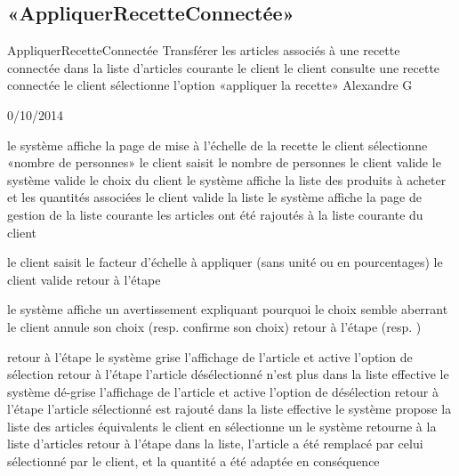 \subsection{«AppliquerRecetteConnectée»}

\startCU
\nom AppliquerRecetteConnectée
\but Transférer les articles associés à une recette connectée dans la liste d'articles courante
\acteur le client
\precondition le client consulte une recette connectée 
\declenchement le client sélectionne l'option «appliquer la recette»
\auteur Alexandre G
\date 30/10/2014

\nominal %
\startnominal
{} le système affiche la page de mise à l'échelle de la recette
 le client sélectionne «nombre de personnes» 
\etape le client saisit le nombre de personnes
\etape le client valide
 le système valide le choix du client
 le système affiche la liste des produits à acheter et les quantités associées
 le client valide la liste
\etape le système affiche la page de gestion de la liste courante
\stopnominal
\postcondition les articles ont été rajoutés à la liste courante du client

\alternatifs 
{} 
  \etape le client saisit le facteur d'échelle à appliquer (sans unité ou en pourcentages)
  \etape le client valide
  \etape retour à l'étape 
\stopcondition
\stopalternatif

  \etape le système affiche un avertissement expliquant pourquoi le choix semble aberrant
  \etape le client annule son choix (resp. confirme son choix)
  \etape retour à l'étape  (resp. )
\stopcondition
\stopalternatif

  \etape retour à l'étape 
\stopcondition
{} 
  \etape le système grise l'affichage de l'article et active l'option de sélection
  \etape retour à l'étape 
\stopcondition
\postcondition l'article désélectionné n'est plus dans la liste effective
  \etape le système dé-grise l'affichage de l'article et active l'option de désélection
  \etape retour à l'étape 
\stopcondition
\postcondition l'article sélectionné est rajouté dans la liste effective
  \etape le système propose la liste des articles équivalents
  \etape le client en sélectionne un
  \etape le système retourne à la liste d'articles
  \etape retour à l'étape 
\stopcondition
\postcondition dans la liste, l'article a été remplacé par celui sélectionné par le client, et la quantité a été adaptée en conséquence
\stopalternatif

